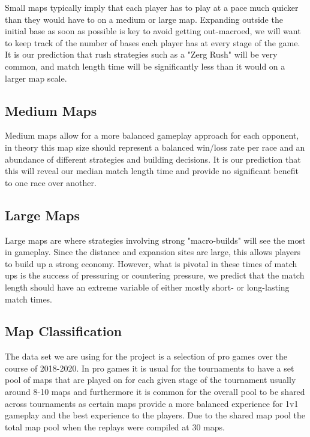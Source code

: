 \documentclass[a4paper,12pt]{report}
\begin{document}
Small maps typically imply that each player has to play at a pace much quicker than they would have to on a medium or large map. Expanding outside the initial base as soon as possible is key to avoid getting out-macroed, we will want to keep track of the number of bases each player has at every stage of the game. It is our prediction that rush strategies such as a "Zerg Rush" will be very common, and match length time will be significantly less than it would on a larger map scale. 

\subsection{Medium Maps}

Medium maps allow for a more balanced gameplay approach for each opponent, in theory this map size should represent a balanced win/loss rate per race and an abundance of different strategies and building decisions. It is our prediction that this will reveal our median match length time and provide no significant benefit to one race over another.

\subsection{Large Maps}

Large maps are where strategies involving strong "macro-builds" will see the most in gameplay. Since the distance and expansion sites are large, this allows players to build up a strong economy. However, what is pivotal in these times of match ups is the success of pressuring or countering pressure, we predict that the match length should have an extreme variable of either mostly short- or long-lasting match times. 

\subsection{Map Classification}

The data set we are using for the project is a selection of pro games over the course of 2018-2020. In pro games it is usual for the tournaments to have a set pool of maps that are played on for each given stage of the tournament usually around 8-10 maps and furthermore it is common for the overall pool to be shared across tournaments as certain maps provide a more balanced experience for 1v1 gameplay and the best experience to the players. Due to the shared map pool the total map pool when the replays were compiled at 30 maps.
\end{document}

